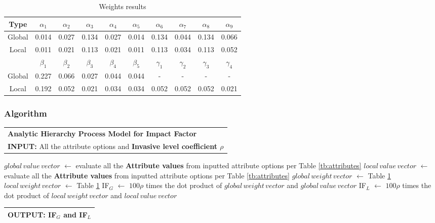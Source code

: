 \documentclass[12pt]{article}
\newcommand{\toB}[1]{\color{blue}#1\color{black}}
\begin{document}
		{
			\fontsize{10}{14}\selectfont
			{
				\begin{longtable}{c|ccccccccc}
					\caption{Weights results}
					\label{tb:weights}\\
					
					\toprule
					Type&$\alpha_1$&$\alpha_2$&$\alpha_3$&$\alpha_4$&$\alpha_5$&$\alpha_6$&$\alpha_7$&$\alpha_8$&$\alpha_9$\\
					\toprule
					Global&0.014&0.027&0.134&0.027&0.014&0.134&0.044&0.134&0.066\\
					Local&0.011&0.021&0.113&0.021&0.011&0.113&0.034&0.113&0.052\\
					\toprule
					\toprule
					&$\beta_1$&$\beta_2$&$\beta_3$&$\beta_4$&$\beta_5$&$\gamma_1$&$\gamma_2$&$\gamma_3$&$\gamma_4$\\
					\toprule
					Global&0.227&0.066&0.027&0.044&0.044&-&-&-&-\\
					Local&0.192&0.052&0.021&0.034&0.034&0.052&0.052&0.052&0.021\\
					\bottomrule
				\end{longtable}
			}
		}	
	
		\subsubsection{Algorithm}	
		\vspace{-0.4cm}
		{
			\fontsize{10}{14}\selectfont
			{
				\setlength{\parindent}{-1em}
				
				{
					\fontsize{12}{18}\selectfont
					\begin{longtable}{p{6.65in}}
						\toprule
						\textbf{Analytic Hierarchy Process Model for Impact Factor}\\
						\textbf{INPUT:} All the attribute options and \textbf{Invasive level coefficient $\rho$} \\
						\bottomrule
					\end{longtable}
				}
				
				\vspace{-0.5em}
				\begin{algorithmic}
					\State \toB{$global\,value\,vector$ } $\gets$ evaluate all the \textbf{Attribute values} from inputted attribute options per Table \ref{tb:attributes}
					\State \toB{$local\,value\,vector$ } $\gets$ evaluate all the \textbf{Attribute values} from inputted attribute options  per Table \ref{tb:attributes}
					\State \toB{$global\,weight\,vector$ } $\gets$ Table \ref{tb:weights}
					\State \toB{$local\,weight\,vector$ } $\gets$ Table \ref{tb:weights}
					\State \toB{IF$_G$ } $\gets$ \toB{$100\rho$ } times the dot product of \toB{$global\,weight\,vector$ } and \toB{$global\,value\,vector$ }
					\State \toB{IF$_L$ } $\gets$ \toB{$100\rho$ } times the dot product of \toB{$local\,weight\,vector$ } and \toB{$local\,value\,vector$ }
				\end{algorithmic}
				
				{
					\fontsize{12}{18}\selectfont
					\begin{longtable}{p{6.6in}}
						\toprule
						\textbf{OUTPUT:} \toB{IF$_G$ } and \toB{IF$_L$}\\
						\bottomrule
					\end{longtable}
				}
			}
		}	
		
\end{document}
